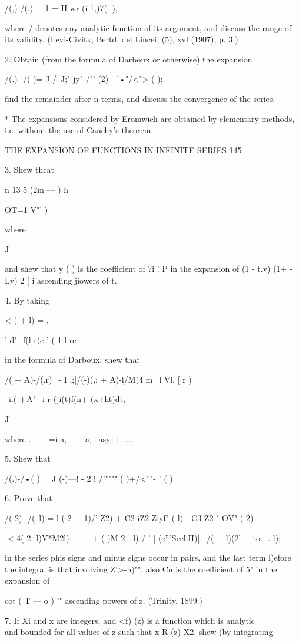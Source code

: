 {{/(,)-/(.) + 1 ± H wr (i 1,)7(. ),

where / denotes any analytic function of its argument, and discuss the
range of its validity. (Levi-Civitk, Bertd. dei Lincei, (5), xvl
(1907), p. 3.)

2. Obtain (from the formula of Darboux or otherwise) the expansion

/(.) -/( )= J /~J;" jy" /"' (2) - '•"/<"> ( );

find the remainder after n terms, and discuss the convergence of the
series.

* The expansions considered by Eromwich are obtained by elementary
methods, i.e. without the use of Cauchy's theorem.

THE EXPANSION OF FUNCTIONS IN INFINITE SERIES 145

3. Shew thcat

n 13 5 (2m — ) h

OT=1 V"' )

where

J

and shew that y ( ) is the coefficient of ?i ! P in the expansion of
(1 - t.v) (1+ - Lv) 2 [ i ascending jiowers of t.

4. By taking

< ( + l) = ,-

' d"- f(l-r)e ' ( 1 l-re-

in the formula of Darboux, shew that

/( + A)-/(.r)=- I ,;|/(-)(,; + A)-l/M(4 m=l Vl. [ r )

\ i.(\ ) A"+i r (ji(t)f(n+ (x+ht)dt,

J

where . \ -—=i-a, ~ + a,~-asy, + ....

5. Shew that

/(.)-/•( ) = J (-)—! - 2 ! /'"""" ( )+/<''"- ' ( )

6. Prove that

/( 2) -/(--l) = l ( 2 - --1)/' Z2) + C2 iZ2-Ziyf" ( l) - C3 Z2 " OV" (
2)

-< 4( 2- l)V*M2l) + --- + (-)M 2---l) / ' | (e'''SechH)| \ /( + l)(2l
+ to.- .-l);

in the series phis signs and minus signs occur in pairs, and the last
term l)efore the integral is that involving Z'>-h)"", also Cn is the
coefficient of 5" in the expansion of

cot ( T — o ) '" ascending powers of z. (Trinity, 1899.)

7. If Xi and x are integers, and <f) (z) is a function which is
analytic and'bounded for all values of z such that x R (z) X2, shew
(by integrating

}}
